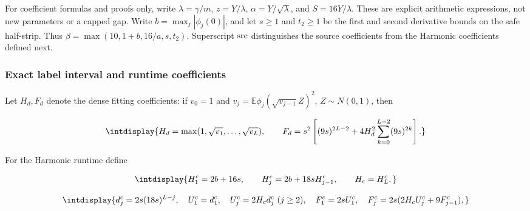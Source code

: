 
For coefficient formulas and proofs only, write \(\lambda=\gamma/m\), \(z=Y/\lambda\), \(\alpha=Y/\sqrt\lambda\), and \(S=16Y/\lambda\). These are explicit arithmetic expressions, not new parameters or a capped gap. Write \(b=\max_j|\phi_j(0)|\), and let \(s\ge1\) and \(t_2\ge1\) be the first and second derivative bounds on the safe half-strip. Thus \(\beta=\max(10,\allowbreak 1+b,\allowbreak 16/a,\allowbreak s,\allowbreak t_2)\). Superscript \({\rm src}\) distinguishes the source coefficients from the Harmonic coefficients defined next.


\subsubsection{Exact label interval and runtime coefficients}
\label{int:compact-fitting-coefficients}
\label{int:harmonic-fitting-coefficients}


Let \(H_d,\allowbreak F_d\) denote the dense fitting coefficients: if \(v_0=1\) and \(v_j=\mathbb E\phi_j(\sqrt{v_{j-1}}Z)^2\), \(Z\sim N(0,\allowbreak 1)\), then


\begingroup\renewcommand{\theHequation}{intdisplay.145}
\begin{equation}
\intdisplay{
H_d=\max(1,\sqrt{v_1},\ldots,\sqrt{v_L}),\qquad
F_d=s^2\left[(9s)^{2L-2}
       +4H_d^2\sum_{k=0}^{L-2}(9s)^{2k}\right].
}
\label{int:eq-0054-harmonic-dense-coefficients}
\end{equation}
\endgroup


For the Harmonic runtime define


\begingroup\renewcommand{\theHequation}{intdisplay.146}
\begin{equation*}
\intdisplay{
H_1^c=2b+16s,\qquad H_j^c=2b+18sH_{j-1}^c,\qquad H_c=H_L^c,
}
\end{equation*}
\endgroup

\begingroup\renewcommand{\theHequation}{intdisplay.147}
\begin{equation*}
\intdisplay{
d_j^c=2s(18s)^{L-j},\quad U_1^c=d_1^c,\quad
U_j^c=2H_cd_j^c\ (j\ge2),\quad
F_1^c=2sU_1^c,\quad F_j^c=2s(2H_cU_j^c+9F_{j-1}^c),
}
\end{equation*}
\endgroup


